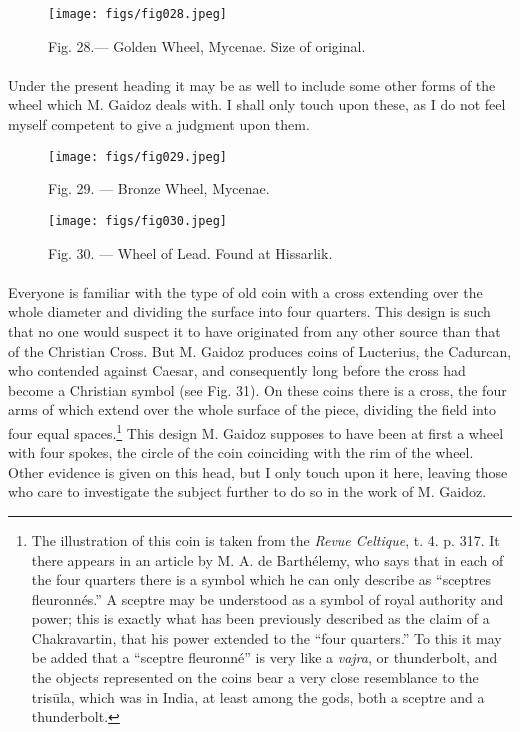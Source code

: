 \documentclass[a4paper, 11pt, oneside, polutonikogreek, english]{article}
\begin{document}
\begin{figure}[H]
\centering
\texttt{[image: figs/fig028.jpeg]}
\caption[Fig. 28.--- Golden Wheel, Mycenae.]{Fig. 28.--- Golden Wheel, Mycenae. Size of original.\footnotemark}
\end{figure}
\paragraph{}
Under the present heading it may be as well to include some other forms of the wheel which M. Gaidoz deals with. I shall only touch upon these, as I do not feel myself competent to give a judgment upon them.

\begin{figure}[H]
\centering
\texttt{[image: figs/fig029.jpeg]}
\caption[Fig. 29. --- Bronze Wheel, Mycenae.]{Fig. 29. --- Bronze Wheel, Mycenae.\footnotemark}
\end{figure}

\begin{figure}[H]
\centering
\texttt{[image: figs/fig030.jpeg]}
\caption[Fig. 30. --- Wheel of Lead.]{Fig. 30. --- Wheel of Lead. Found at Hissarlik.\footnotemark}
\end{figure}
\paragraph{}
Everyone is familiar with the type of old coin with a cross extending over the whole diameter and dividing the surface into four quarters. This design is such that no one would suspect it to have originated from any other source than that of the Christian Cross. But M. Gaidoz produces coins of Lucterius, the Cadurcan, who contended against Caesar, and consequently long before the cross had become a Christian symbol (see Fig. 31). On these coins there is a cross, the four arms of which extend over the whole surface of the piece, dividing the field into four equal spaces.\footnote{The illustration of this coin is taken from the \emph{Revue Celtique}, t. 4. p. 317. It there appears in an article by M. A. de Barthélemy, who says that in each of the four quarters there is a symbol which he can only describe as ``sceptres fleuronnés.'' A sceptre may be understood as a symbol of royal authority and power; this is exactly what has been previously described as the claim of a Chakravartin, that his power extended to the ``four quarters.'' To this it may be added that a ``sceptre fleuronné'' is very like a \emph{vajra}, or thunderbolt, and the objects represented on the coins bear a very close resemblance to the trisūla, which was in India, at least among the gods, both a sceptre and a thunderbolt.} This design M. Gaidoz supposes to have been at first a wheel with four spokes, the circle of the coin coinciding with the rim of the wheel. Other evidence is given on this head, but I only touch upon it here, leaving those who care to investigate the subject further to do so in the work of M. Gaidoz.
\end{document}

